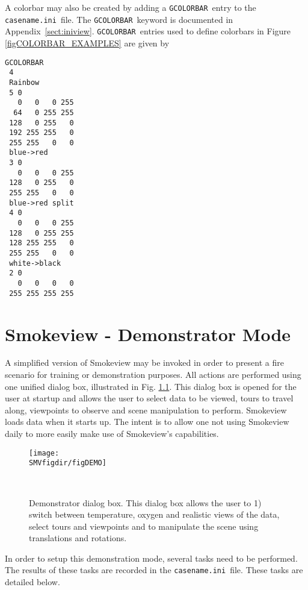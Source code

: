 \documentclass[11pt,twoside]{book}
\begin{document}
A colorbar may also be created by adding a {\tt GCOLORBAR}\ entry to the {\tt casename.ini}\ file.
The {\tt GCOLORBAR}\ keyword is documented in Appendix~\ref{sect:iniview}. {\tt GCOLORBAR}\
entries used to define colorbars in Figure \ref{figCOLORBAR_EXAMPLES} are given by
\begin{lstlisting}
GCOLORBAR
 4
 Rainbow
 5 0
   0   0   0 255
  64   0 255 255
 128   0 255   0
 192 255 255   0
 255 255   0   0
 blue->red
 3 0
   0   0   0 255
 128   0 255   0
 255 255   0   0
 blue->red split
 4 0
   0   0   0 255
 128   0 255 255
 128 255 255   0
 255 255   0   0
 white->black
 2 0
   0   0   0   0
 255 255 255 255
\end{lstlisting}




\chapter{Smokeview - Demonstrator Mode}
A simplified version of Smokeview may be invoked in order to present a fire
scenario for training or demonstration
purposes.  All actions are performed using one unified dialog box,
illustrated in Fig. \ref{figDEMO}.  This dialog box is opened for the
user at startup and allows the user to select data to be viewed, tours to
travel along, viewpoints to observe and scene manipulation to perform.
Smokeview loads data when it starts up.
The intent is to allow one not using Smokeview daily to more easily
make use of Smokeview's capabilities.


\begin{figure}[bph]
\begin{center}
\texttt{[image: \\SMVfigdir/figDEMO]}
\end{center}
\caption[Demonstrator dialog box.]{Demonstrator dialog box.
This dialog box allows the user to 1) switch between temperature,
oxygen and realistic views of the data,
select tours and viewpoints
 and to manipulate the scene using translations and rotations.}\ \label{figDEMO}
\end{figure}

In order to setup this demonstration mode, several tasks need to be performed.
The results of these tasks are
recorded in the {\tt casename.ini}\ file.
These tasks are detailed below.
\end{document}
